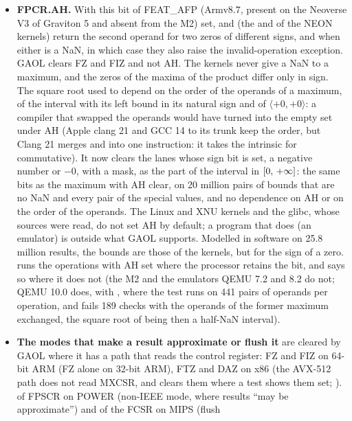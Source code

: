 \begin{itemize}
\item[$\bullet$] \textbf{FPCR.AH.} With this bit of FEAT\_AFP (Armv8.7,
present on the Neoverse V3 of Graviton 5 and absent from the M2) set,
 and  (the  and 
of the NEON kernels) return the second operand for two zeros of different
signs, and when either is a NaN, in which case they also raise the
invalid-operation exception. GAOL clears FZ and FIZ and not AH. The kernels
never give a NaN to a maximum, and the zeros of the maxima of the product
differ only in sign. The square root used to depend on the order of the
operands of a maximum, of the interval with its left bound in its natural
sign and of $\langle +0, +0 \rangle$: a compiler that swapped the operands
would have turned  into the empty set under AH (Apple
clang 21 and GCC 14 to its trunk keep the order, but Clang 21 merges
 and  into one instruction:
it takes the intrinsic for commutative). It now clears the lanes whose sign
bit is set, a negative number or $-0$, with a mask, as the part of the
interval in $[0,\,+\infty]$:\newinvfive{} the same bits as the maximum
with AH clear, on 20 million pairs of bounds that are no NaN and every pair
of the special values, and no dependence on AH or on the order of the
operands. The Linux and XNU kernels and the glibc, whose sources were read,
do not set AH by default; a program that does (an emulator) is outside what
GAOL supports. Modelled in software on 25.8 million results, the bounds are
those of the kernels, but for the sign of a zero.
 runs the operations with AH set where
the processor retains the bit, and says so where it does not (the M2 and the
emulators QEMU 7.2 and 8.2 do not; QEMU 10.0 does, with
, where the test runs on 441 pairs of operands
per operation, and fails 189 checks with the operands of the former maximum
exchanged, the square root of \code{[-0, r]} being then a half-NaN
interval).
\item[$\bullet$] \textbf{The modes that make a result approximate or flush
it} are cleared by GAOL where it has a path that reads the control register:
FZ and FIZ on 64-bit ARM (FZ alone on 32-bit ARM), FTZ and DAZ on x86 (the
AVX-512 path does not read MXCSR, and clears them where a test shows them
set; ).  of FPSCR on POWER (non-IEEE mode, where
results ``may be approximate'') and  of the FCSR on MIPS (flush

\end{itemize}
